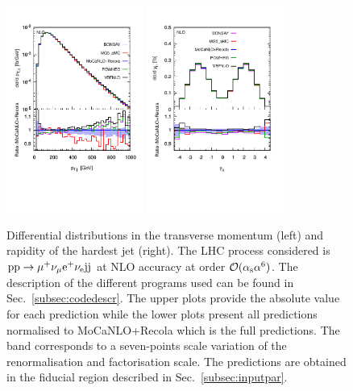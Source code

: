 \documentclass[twocolumn,epjc3]{svjour3} %
\newlength{\width}
\begin{document}
     \begin{figure}[hbt!]
       \centering
       \includegraphics[width=0.4\textwidth,angle=0,clip=true,trim={0.4cm 2cm 0.cm 1.cm}]{figures/NLO/ptj1_NLO.pdf}
       \includegraphics[width=0.4\textwidth,angle=0,clip=true,trim={0.4cm 2cm 0.cm 1.cm}]{figures/NLO/yj1_NLO.pdf}
    \caption{\label{fig:distNLO2} Differential distributions in the transverse momentum (left) and rapidity of the hardest jet (right).
    The LHC process considered is ${\rm p}{\rm p}\to\mu^+\nu_\mu{\rm e}^+\nu_{\rm e}{\rm j}{\rm j}$ at NLO accuracy at order $\mathcal{O}(\alpha_{\rm s}\alpha^6)$.
    The description of the different programs used can be found in Sec.~\protect\ref{subsec:codedescr}.
    The upper plots provide the absolute value for each prediction while the lower plots present all predictions normalised to {\sc MoCaNLO}+{\sc Recola} which is the full predictions.
    The band corresponds to a seven-points scale variation of the renormalisation and factorisation scale.
    The predictions are obtained in the fiducial region described in Sec.~\ref{subsec:inputpar}.
    }
    \end{figure}
\end{document}
